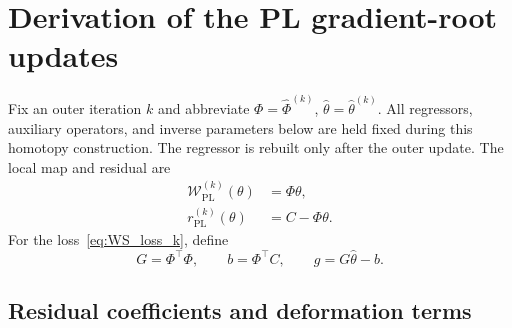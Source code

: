 
\section{Derivation of the PL gradient-root updates}
\label{app:gotham_pl_updates}

Fix an outer iteration $k$ and abbreviate
$\Phi=\hat\Phi^{(k)}$, $\hat\theta=\hat\theta^{(k)}$.
All regressors, auxiliary operators, and inverse parameters below are
held fixed during this homotopy construction. The regressor is rebuilt
only after the outer update. The local map and residual are
\begin{align}
\label{eq:WS_pseudolinear_operator_k}
    \mathcal W_{\mathrm{PL}}^{(k)}(\theta)&=\Phi\theta,\\
\label{eq:WS_PL_residual_k}
    r_{\mathrm{PL}}^{(k)}(\theta)&=C-\Phi\theta.
\end{align}
For the loss~\eqref{eq:WS_loss_k}, define
\begin{equation}
\label{eq:WS_gradient_hessian_definitions}
    G=\Phi^\top\Phi,\qquad b=\Phi^\top C,\qquad
    g=G\hat\theta-b.
\end{equation}

\subsection{Residual coefficients and deformation terms}

